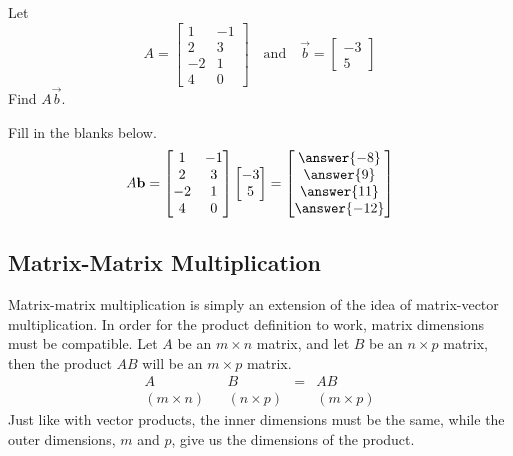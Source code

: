 \documentclass{ximera}
\begin{document}
\begin{example}\label{ex:matrixvectormultpractice}
Let $$A=\begin{bmatrix}1&-1\\2&3\\-2&1\\4&0\end{bmatrix}\quad\text{and}\quad\vec{b}=\begin{bmatrix}-3\\5\end{bmatrix}
$$
Find $A\vec{b}$.
\begin{explanation}
Fill in the blanks below.  
$$A\vec{b}=\begin{bmatrix}1&-1\\2&3\\-2&1\\4&0\end{bmatrix}\begin{bmatrix}-3\\5\end{bmatrix}=\begin{bmatrix}\answer{-8}\\\answer{9}\\\answer{11}\\\answer{-12}\end{bmatrix}
$$
\end{explanation}
\end{example}

\subsection*{Matrix-Matrix Multiplication}

Matrix-matrix multiplication is simply an extension of the idea of matrix-vector multiplication.  In order for the product definition to work, matrix dimensions must be compatible.  Let $A$ be an $m\times n$ matrix, and let $B$ be an $n\times p$ matrix, then the product $AB$ will be an $m\times p$ matrix.
$$\begin{array}{ccccc}
A& & B &=& AB\\
(m\times n) & &(n\times p) & &(m\times p)
\end{array}$$
Just like with vector products, the inner dimensions must be the same, while the outer dimensions, $m$ and $p$, give us the dimensions of the product.
\end{document}
